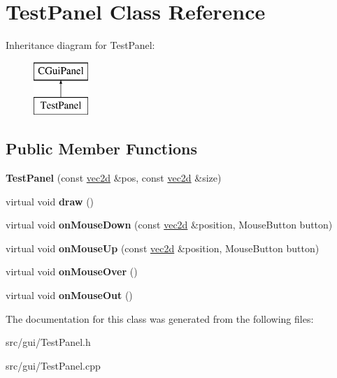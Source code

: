 \hypertarget{class_test_panel}{
\section{TestPanel Class Reference}
\label{class_test_panel}
}
Inheritance diagram for TestPanel:\begin{figure}[H]
\begin{center}
\leavevmode
\includegraphics[height=2.000000cm]{class_test_panel}
\end{center}
\end{figure}
\subsection*{Public Member Functions}
\begin{DoxyCompactItemize}
\item 
\hypertarget{class_test_panel_abe43f13e886824378d7a59a4f784d078}{
{\bfseries TestPanel} (const \hyperlink{classvec2d}{vec2d} \&pos, const \hyperlink{classvec2d}{vec2d} \&size)}
\label{class_test_panel_abe43f13e886824378d7a59a4f784d078}

\item 
\hypertarget{class_test_panel_a84c91fe6c8223ec2cadf4c296f274c22}{
virtual void {\bfseries draw} ()}
\label{class_test_panel_a84c91fe6c8223ec2cadf4c296f274c22}

\item 
\hypertarget{class_test_panel_ae8b251d87c6169943e7e4ece3f1fe3c7}{
virtual void {\bfseries onMouseDown} (const \hyperlink{classvec2d}{vec2d} \&position, MouseButton button)}
\label{class_test_panel_ae8b251d87c6169943e7e4ece3f1fe3c7}

\item 
\hypertarget{class_test_panel_a7d4a569a0e32b459cbf3c287b99fa3a4}{
virtual void {\bfseries onMouseUp} (const \hyperlink{classvec2d}{vec2d} \&position, MouseButton button)}
\label{class_test_panel_a7d4a569a0e32b459cbf3c287b99fa3a4}

\item 
\hypertarget{class_test_panel_a604f62887198762cc29b6365155e000d}{
virtual void {\bfseries onMouseOver} ()}
\label{class_test_panel_a604f62887198762cc29b6365155e000d}

\item 
\hypertarget{class_test_panel_afb28903b1775fa90bdcee423a1b90640}{
virtual void {\bfseries onMouseOut} ()}
\label{class_test_panel_afb28903b1775fa90bdcee423a1b90640}

\end{DoxyCompactItemize}


The documentation for this class was generated from the following files:\begin{DoxyCompactItemize}
\item 
src/gui/TestPanel.h\item 
src/gui/TestPanel.cpp\end{DoxyCompactItemize}
